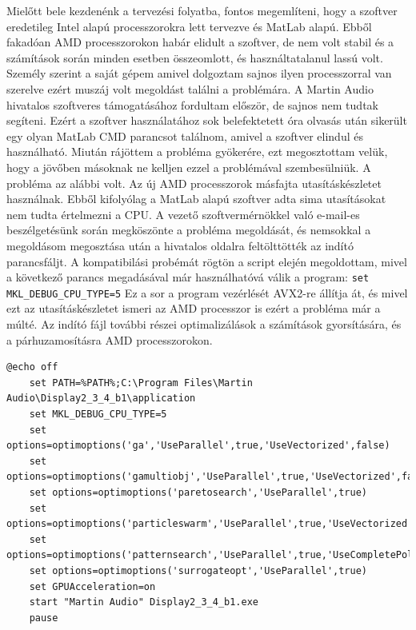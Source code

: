 Mielőtt bele kezdenénk a tervezési folyatba, fontos megemlíteni, hogy a szoftver 
eredetileg Intel alapú processzorokra lett tervezve és MatLab alapú. Ebből fakadóan
AMD processzorokon habár elidult a szoftver, de nem volt stabil és a számítások során
minden esetben összeomlott, és használtatalanul lassú volt. Személy szerint a saját gépem amivel dolgoztam
sajnos ilyen processzorral van szerelve ezért muszáj volt megoldást találni a problémára.
A Martin Audio hivatalos szoftveres támogatásához fordultam először, de sajnos nem tudtak segíteni.
Ezért a szoftver használatához
sok belefektetett óra olvasás után sikerült egy olyan MatLab CMD parancsot találnom, amivel
a szoftver elindul és használható. 
Miután rájöttem a probléma gyökerére, ezt megosztottam velük, hogy a jövőben másoknak ne kelljen
ezzel a problémával szembesülniük. 
A probléma az alábbi volt. Az új AMD processzorok másfajta utasításkészletet használnak. 
Ebből kifolyólag a MatLab alapú szoftver adta sima utasításokat nem tudta értelmezni a CPU.
A vezető szoftvermérnökkel való e-mail-es beszélgetésünk során megköszönte a probléma
megoldását, és nemsokkal a megoldásom megosztása után a hivatalos oldalra feltölttötték
az indító parancsfáljt. A kompatibilási probémát rögtön a script elején megoldottam,
mivel a következő parancs megadásával már használhatóvá válik a program: \texttt{set MKL\_DEBUG\_CPU\_TYPE=5} \newline
Ez a sor a program vezérlését AVX2-re állítja át, és mivel ezt az utasításkészletet ismeri az AMD processzor
is ezért a probléma már a múlté.
Az indító fájl további részei optimalizálások a számítások gyorsítására, és a párhuzamosításra AMD processzorokon.

\begin{lstlisting}[caption={A Display 2.3.4 b1 indító ".bat" scriptje AMD processzorokhoz}, label=batcode]
    @echo off
    set PATH=%PATH%;C:\Program Files\Martin Audio\Display2_3_4_b1\application
    set MKL_DEBUG_CPU_TYPE=5
    set options=optimoptions('ga','UseParallel',true,'UseVectorized',false)
    set options=optimoptions('gamultiobj','UseParallel',true,'UseVectorized',false)
    set options=optimoptions('paretosearch','UseParallel',true)
    set options=optimoptions('particleswarm','UseParallel',true,'UseVectorized',false)
    set options=optimoptions('patternsearch','UseParallel',true,'UseCompletePoll',true,'UseVectorized',false)
    set options=optimoptions('surrogateopt','UseParallel',true)
    set GPUAcceleration=on
    start "Martin Audio" Display2_3_4_b1.exe
    pause
\end{lstlisting}


